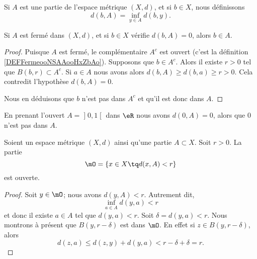 \begin{definition}      \label{DEFooGNNUooFUZINs}
	Si \( A\) est une partie de l'espace métrique \( (X,d)\), et si \( b\in X\), nous définissons
	\begin{equation}
		d(b,A)=\inf_{y\in A}d(b,y).
	\end{equation}
\end{definition}

\begin{lemma}        \label{LEMooAIARooQADaxM}
	Si \( A\) est fermé dans \( (X,d)\), et si \( b\in X\) vérifie \( d(b,A)=0\), alors \( b\in A\).
\end{lemma}

\begin{proof}
    Puisque \( A\) est fermé, le complémentaire \( A^c\) est ouvert (c'est la définition \ref{DEFFermeooNSAAooHxZbAo}). Supposons que \( b\in A^c\). Alors il existe \( r>0\) tel que \( B(b,r)\subset A^c\). Si \( a\in A\) nous avons alors \( d(b,A)\geq d(b,a)\geq r>0\). Cela contredit l'hypothèse \( d(b,A)=0\).

	Nous en déduisons que \( b\) n'est pas dans \( A^c\) et qu'il est donc dans \( A\).
\end{proof}


\begin{example}
	En prenant l'ouvert \( A=\mathopen] 0 , 1 \mathclose[\) dans \( \eR\) nous avons \( d(0,A)=0\), alors que \( 0\) n'est pas dans \( A\).
\end{example}

\begin{lemma}    \label{LEMooJNRTooZyKiFC}
	Soient un espace métrique \( (X,d)\) ainsi qu'une partie \( A\subset X\). Soit \( r>0\). La partie
	\begin{equation}
		\mO=\{ x\in X\tq d(x,A) < r\}
	\end{equation}
	est ouverte.
\end{lemma}

\begin{proof}
	Soit \( y\in \mO\); nous avons \( d(y,A)<r\). Autrement dit,
	\begin{equation}
		\inf_{a\in A}d(y,a)<r
	\end{equation}
	et donc il existe \( a\in A\) tel que \( d(y,a)<r\). Soit \( \delta=d(y,a)<r\). Nous montrons à présent que \( B(y,r-\delta)\) est dans \( \mO\). En effet si \( z\in B(y,r-\delta)\), alors
	\begin{equation}
		d(z,a)\leq d(z,y)+d(y,a)<r-\delta+\delta=r.
	\end{equation}
\end{proof}

